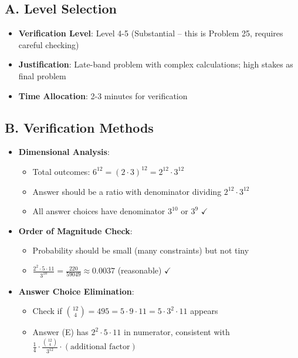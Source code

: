 \documentclass[]{article}
\begin{document}
\begin{verificationbox}
\subsection*{A. Level Selection}
\begin{itemize}[leftmargin=*]
    \item \textbf{Verification Level}: Level 4-5 (Substantial -- this is Problem 25, requires careful checking)
    \item \textbf{Justification}: Late-band problem with complex calculations; high stakes as final problem
    \item \textbf{Time Allocation}: 2-3 minutes for verification
\end{itemize}

\subsection*{B. Verification Methods}
\begin{itemize}[leftmargin=*]
    \item \textbf{Dimensional Analysis}: 
    \begin{itemize}
        \item Total outcomes: $6^{12} = (2 \cdot 3)^{12} = 2^{12} \cdot 3^{12}$
        \item Answer should be a ratio with denominator dividing $2^{12} \cdot 3^{12}$
        \item All answer choices have denominator $3^{10}$ or $3^{9}$ $\checkmark$
    \end{itemize}
    \item \textbf{Order of Magnitude Check}:
    \begin{itemize}
        \item Probability should be small (many constraints) but not tiny
        \item $\frac{2^2 \cdot 5 \cdot 11}{3^{10}} = \frac{220}{59049} \approx 0.0037$ (reasonable) $\checkmark$
    \end{itemize}
    \item \textbf{Answer Choice Elimination}:
    \begin{itemize}
        \item Check if $\binom{12}{4} = 495 = 5 \cdot 9 \cdot 11 = 5 \cdot 3^2 \cdot 11$ appears
        \item Answer (E) has $2^2 \cdot 5 \cdot 11$ in numerator, consistent with $\frac{1}{4} \cdot \frac{\binom{12}{4}}{3^{12}} \cdot (\text{additional factor})$

\end{itemize}
\end{itemize}
\end{verificationbox}
\end{document}
